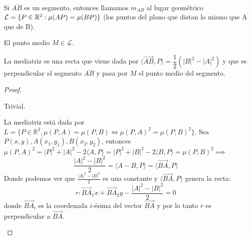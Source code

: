 \begin{ndef} \hfill\\
\begin{minipage}[c]{0.70\textwidth}
  Si $\overline{AB}$ es un segmento, entonces llamamos $m_{AB}$  al lugar geométrico $\mathcal{L}=\{P \in \mathbb{R}^2 : \mu(AP) = \mu(BP)\}$ (los puntos del plano que distan lo mismo que A que de B).
\end{minipage}
\begin{minipage}[]{0.27\textwidth}
  \begin{center}
  \sffamily
\end{center}
\end{minipage}
\end{ndef}

\begin{nprop}\hfill
  \begin{nlist}
    \item El punto medio $M \in \mathcal{L}$.
    \item La mediatriz es una recta que viene dada por $\langle\vec{AB},P\rangle  = \dfrac{1}{2}(|B|^2-|A|^2)$ y que es perpendicular al segmento $\overline{AB}$ y pasa por $M$ el punto medio del segmento.
  \end{nlist}
\end{nprop}

\begin{proof}\hfill
  \begin{nlist}
    \item Trivial.
    \item La mediatriz está dada por $L = \{P\in\mathbb{R}^2, \mu(P,A) = \mu(P,B)\iff \mu(P,A)^2 = \mu(P,B)^2\}$. Sea $P(x,y),A(x_1,y_1),B(x_2,y_2)$, entonces $\mu(P,A)^2 = |P|^2+|A|^2-2\langle A,P\rangle  = |P|^2+|B|^2-2\langle B,P\rangle = \mu(P,B)^2 \implies$ $$ \frac{|A|^2-|B|^2}{2} =\langle A-B,P\rangle  = \langle\vec{BA},P\rangle $$
    Donde podemos ver que $\frac{|A|^2-|B|^2}{2}$ es una constante y $\langle\vec{BA},P\rangle $ genera la recta:
    \[
      r: \vec{BA}_1x+ \vec{BA}_2y - \frac{|A|^2-|B|^2}{2} = 0
    \]
    donde $\vec{BA}_i$ es la coordenada $i$-ésima del vector $\vec{BA}$ y por lo tanto $r$ es perpendicular a $\vec{BA}$.
  \end{nlist}
\end{proof}

